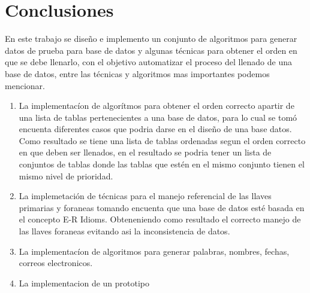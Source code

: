 \chapter{Conclusiones}
En este trabajo se dise\~no e implemento un conjunto de algoritmos para generar datos de prueba para base de datos y algunas t\'ecnicas para obtener el orden en que se debe llenarlo, con el objetivo automatizar el proceso del llenado de una base de datos, entre las t\'ecnicas y algoritmos mas importantes podemos mencionar.

\begin{enumerate}
\item La implementac\'ion de algor\'itmos para obtener el orden correcto apartir de una lista de tablas pertenecientes a una base de datos, para lo cual se tom\'o encuenta diferentes casos que podria darse en el dise\~no de una base datos. Como resultado se tiene una lista de tablas ordenadas segun el orden correcto en que deben ser llenados, en el resultado se podria tener un lista de conjuntos de tablas donde las tablas que est\'en en el mismo conjunto tienen el mismo nivel de prioridad.
\item La implemetaci\'on de t\'ecnicas para el manejo referencial de las llaves primarias y foraneas tomando encuenta que una base de datos est\'e  basada en el concepto E-R Idioms. Obteneniendo como resultado el correcto manejo de las llaves foraneas evitando asi la inconsistencia de datos.
\item La implementac\'ion de algoritmos para generar palabras, nombres, fechas, correos electronicos.
\item La implementacion de un prototipo   
\end{enumerate}